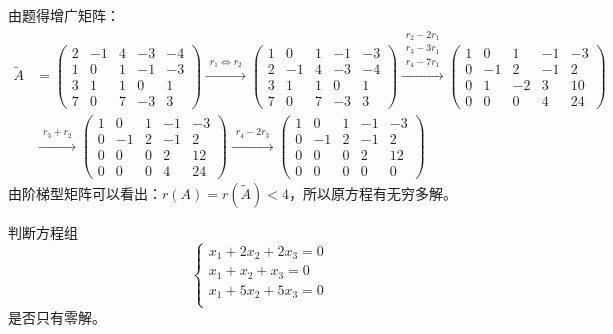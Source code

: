 \documentclass[a4paper]{report}
\begin{document}
\begin{jie}
由题得增广矩阵：
\begin{align*}
\widetilde{A}&=
\begin{pmatrix}
2&-1&4&-3&-4\\
1&0&1&-1&-3\\
3&1&1&0&1\\
7&0&7&-3&3
\end{pmatrix}\xrightarrow{\substack{r_1 \Leftrightarrow r_2}}{
\begin{pmatrix}
1&0&1&-1&-3\\
2&-1&4&-3&-4\\
3&1&1&0&1\\
7&0&7&-3&3
\end{pmatrix}
}\xrightarrow{\substack{r_2-2r_1\\ r_3-3r_1\\ r_4-7r_1}}{
\begin{pmatrix}
1&0&1&-1&-3\\
0&-1&2&-1&2\\
0&1&-2&3&10\\
0&0&0&4&24
\end{pmatrix}
}\\
&\xrightarrow{\substack{r_3+r_2}}{
\begin{pmatrix}
1&0&1&-1&-3\\
0&-1&2&-1&2\\
0&0&0&2&12\\
0&0&0&4&24
\end{pmatrix}
}\xrightarrow{\substack{r_4-2r_3}}{
\begin{pmatrix}
1&0&1&-1&-3\\
0&-1&2&-1&2\\
0&0&0&2&12\\
0&0&0&0&0
\end{pmatrix}
}
\end{align*}
由阶梯型矩阵可以看出：$r(A)=r(\widetilde{A})<4$，所以原方程有无穷多解。
\end{jie}

\EX 判断方程组
\begin{equation*}
\begin{cases}
x_1+2x_2+2x_3=0\\
x_1+x_2+x_3=0\\
x_1+5x_2+5x_3=0\\
\end{cases}
\end{equation*}
是否只有零解。
\end{document}
